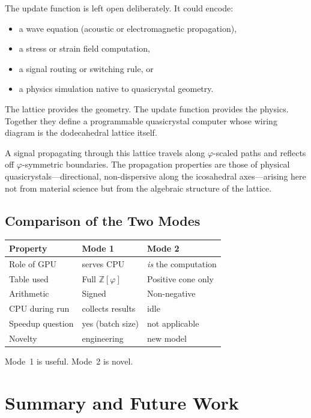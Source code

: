 \documentclass[12pt]{article}
\theoremstyle{definition}
\theoremstyle{remark}
\newcommand{\Zphi}{\mathbb{Z}[\varphi]}
\begin{document}
The update function is left open deliberately.  It could encode:
\begin{itemize}[nosep]
  \item a wave equation (acoustic or electromagnetic propagation),
  \item a stress or strain field computation,
  \item a signal routing or switching rule, or
  \item a physics simulation native to quasicrystal geometry.
\end{itemize}

The lattice provides the geometry.  The update function provides the
physics.  Together they define a programmable quasicrystal computer
whose wiring diagram is the dodecahedral lattice itself.

A signal propagating through this lattice travels along $\varphi$-scaled
paths and reflects off $\varphi$-symmetric boundaries.  The propagation
properties are those of physical quasicrystals---directional,
non-dispersive along the icosahedral axes---arising here not from
material science but from the algebraic structure of the lattice.

\subsection{Comparison of the Two Modes}

\begin{center}
\renewcommand{\arraystretch}{1.3}
\begin{tabular}{lll}
\toprule
Property & Mode 1 & Mode 2 \\
\midrule
Role of GPU & serves CPU & \emph{is} the computation \\
Table used & Full $\Zphi$ & Positive cone only \\
Arithmetic & Signed & Non-negative \\
CPU during run & collects results & idle \\
Speedup question & yes (batch size) & not applicable \\
Novelty & engineering & new model \\
\bottomrule
\end{tabular}
\end{center}

Mode~1 is useful.  Mode~2 is novel.

\section{Summary and Future Work}
\end{document}
